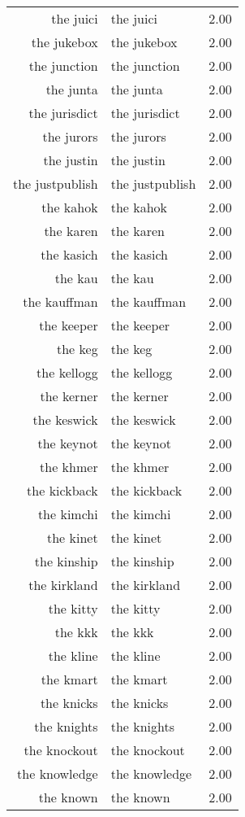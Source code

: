 \begin{table}[ht]
\begin{tabular}{rlr}
  the juici & the juici & 2.00 \\ 
  the jukebox & the jukebox & 2.00 \\ 
  the junction & the junction & 2.00 \\ 
  the junta & the junta & 2.00 \\ 
  the jurisdict & the jurisdict & 2.00 \\ 
  the jurors & the jurors & 2.00 \\ 
  the justin & the justin & 2.00 \\ 
  the justpublish & the justpublish & 2.00 \\ 
  the kahok & the kahok & 2.00 \\ 
  the karen & the karen & 2.00 \\ 
  the kasich & the kasich & 2.00 \\ 
  the kau & the kau & 2.00 \\ 
  the kauffman & the kauffman & 2.00 \\ 
  the keeper & the keeper & 2.00 \\ 
  the keg & the keg & 2.00 \\ 
  the kellogg & the kellogg & 2.00 \\ 
  the kerner & the kerner & 2.00 \\ 
  the keswick & the keswick & 2.00 \\ 
  the keynot & the keynot & 2.00 \\ 
  the khmer & the khmer & 2.00 \\ 
  the kickback & the kickback & 2.00 \\ 
  the kimchi & the kimchi & 2.00 \\ 
  the kinet & the kinet & 2.00 \\ 
  the kinship & the kinship & 2.00 \\ 
  the kirkland & the kirkland & 2.00 \\ 
  the kitty & the kitty & 2.00 \\ 
  the kkk & the kkk & 2.00 \\ 
  the kline & the kline & 2.00 \\ 
  the kmart & the kmart & 2.00 \\ 
  the knicks & the knicks & 2.00 \\ 
  the knights & the knights & 2.00 \\ 
  the knockout & the knockout & 2.00 \\ 
  the knowledge & the knowledge & 2.00 \\ 
  the known & the known & 2.00 \\ 

\end{tabular}
\end{table}
